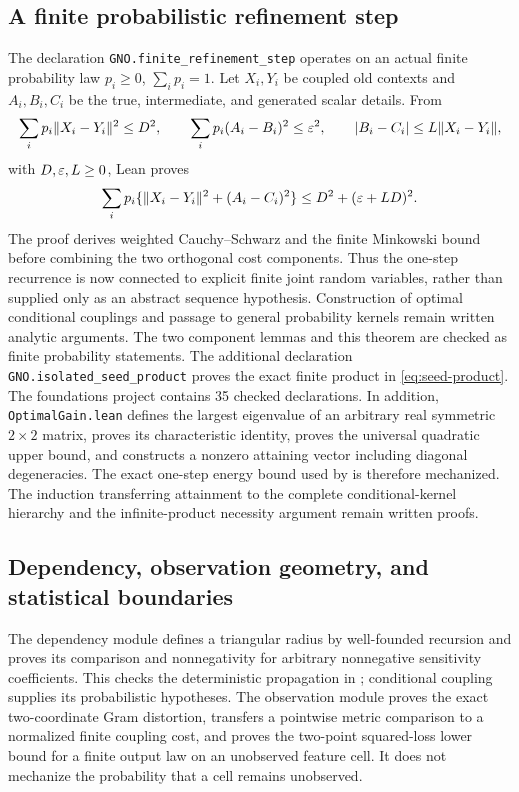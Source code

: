\subsection{A finite probabilistic refinement step}
The declaration \texttt{GNO.finite\_refinement\_step} operates on an actual finite probability law $p_i\ge0$, $\sum_i p_i=1$. Let $X_i,Y_i$ be coupled old contexts and $A_i,B_i,C_i$ be the true, intermediate, and generated scalar details. From
\[
 \sum_i p_i\|X_i-Y_i\|^2\le D^2,\qquad
 \sum_i p_i(A_i-B_i)^2\le\varepsilon^2,\qquad
 |B_i-C_i|\le L\|X_i-Y_i\|,
\]
with $D,\varepsilon,L\ge0$, Lean proves
\begin{equation}\label{eq:lean-finite-step}
 \sum_i p_i\{\|X_i-Y_i\|^2+(A_i-C_i)^2\}
 \le D^2+(\varepsilon+LD)^2.
\end{equation}
The proof derives weighted Cauchy--Schwarz and the finite Minkowski bound before combining the two orthogonal cost components. Thus the one-step recurrence is now connected to explicit finite joint random variables, rather than supplied only as an abstract sequence hypothesis. Construction of optimal conditional couplings and passage to general probability kernels remain written analytic arguments. The two component lemmas and this theorem are checked as finite probability statements. The additional declaration \texttt{GNO.isolated\_seed\_product} proves the exact finite product in \eqref{eq:seed-product}. The foundations project contains 35 checked declarations. In addition, \texttt{OptimalGain.lean} defines the largest eigenvalue of an arbitrary real symmetric $2\times2$ matrix, proves its characteristic identity, proves the universal quadratic upper bound, and constructs a nonzero attaining vector including diagonal degeneracies. The exact one-step energy bound used by  is therefore mechanized. The induction transferring attainment to the complete conditional-kernel hierarchy and the infinite-product necessity argument remain written proofs.

\subsection{Dependency, observation geometry, and statistical boundaries}
The dependency module defines a triangular radius by well-founded recursion and proves its comparison and nonnegativity for arbitrary nonnegative sensitivity coefficients. This checks the deterministic propagation in ; conditional coupling supplies its probabilistic hypotheses. The observation module proves the exact two-coordinate Gram distortion, transfers a pointwise metric comparison to a normalized finite coupling cost, and proves the two-point squared-loss lower bound for a finite output law on an unobserved feature cell. It does not mechanize the probability that a cell remains unobserved.

